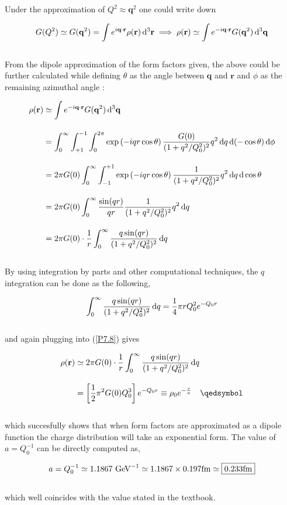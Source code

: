 \begin{solution}
Under the approximation of $Q^2 \approx \mathbf{q}^2 $ one could write down 

\begin{align*}
    G(Q^2) \simeq G(\mathbf{q}^2) = \int e^{i\mathbf{q}\cdot \mathbf{r}} \rho(\mathbf{r} ) \mathop{}\!\mathrm{d}^3 \mathbf{r} \implies \rho(\mathbf{r}) \simeq \int e^{-i \mathbf{q}\cdot \mathbf{r} } G(\mathbf{q}^2) \mathop{}\!\mathrm{d}^3 \mathbf{q}
\end{align*}\\
From the dipole approximation of the form factors given, the above could be further calculated while defining $\theta$ as the angle between $\mathbf{q}$ and $\mathbf{r}$ and $\phi$ as the remaining azimuthal angle : 

\begin{align}
    \rho(\mathbf{r}) &\simeq \int e^{-i \mathbf{q}\cdot \mathbf{r} } G(\mathbf{q}^2) \dif^3 \mathbf{q} \nonumber \\[0.15in] \nonumber
    &= \int_0^\infty \int_{+1}^{-1} \int_0^{2\pi} \exp \left( -i qr \cos \theta \right)  \frac{G(0)}{(1+q^2/Q_0^2)^2} q^2 \dif q \dif(-\cos\theta) \dif \phi \\[0.15in]\nonumber
    &= 2\pi G(0) \int_0^\infty \int_{-1}^{+1} \exp \left( -i qr \cos \theta \right)  \frac{1}{(1+q^2/Q_0^2)^2} q^2 \dif q \dif \cos\theta  \\[0.15in]\nonumber
    &= 2\pi G(0) \int_0^\infty  \frac{\sin(qr)}{qr}  \frac{1}{(1+q^2/Q_0^2)^2} q^2 \dif q  \\[0.15in]
    &=  2\pi G(0) \cdot \frac{1}{r} \int_0^\infty  \frac{q \sin(qr)}{(1+q^2/Q_0^2)^2} \dif q   \label{P7.8}
\end{align}\\
By using integration by parts and other computational techniques, the $q$ integration can be done as the following,

\begin{align*}
    \int_0^\infty \frac{q\sin(qr)}{(1+q^2/Q_0^2)^2} \mathop{}\!\mathrm{d} q = \frac{1}{4}\pi r Q_0^2 e^{-Q_0r}
\end{align*}\\
and again plugging into (\ref{P7.8}) gives 

\begin{align*}
    \rho(\mathbf{r}) &\simeq  2\pi G(0) \cdot \frac{1}{r} \int_0^\infty  \frac{q \sin(qr)}{(1+q^2/Q_0^2)^2} \dif q \\[0.125in]
    &= \left[ \frac{1}{2} \pi^2 G(0) Q_0^3 \right] e^{-Q_0 r} \equiv \rho_0 e^{-\frac{r}{a}} \qed
\end{align*}\\
which succesfully shows that when form factors are approximated as a dipole function the charge distribution will take an exponential form. The value of $a=Q_0^{-1}$ can be directly computed as,

\begin{align*}
    a = Q_0^{-1} \simeq 1.1867 \GeV^{-1} \simeq 1.1867 \times 0.197 \unit{fm} \simeq \boxed{0.233 \unit{fm}}
\end{align*}\\
which well coincides with the value stated in the textbook.
\end{solution}

